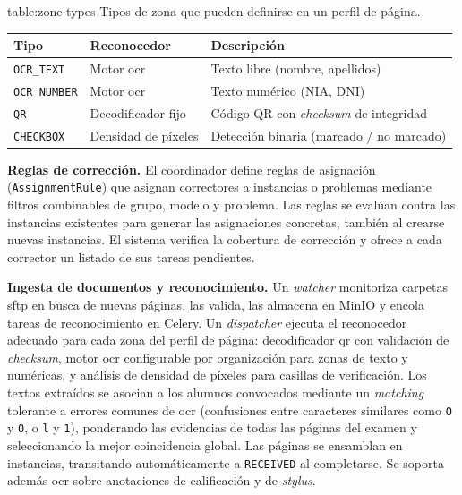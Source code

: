 \begin{functional}
  \begin{table}[Tipos de zona de reconocimiento]{table:zone-types}{%
      Tipos de zona que pueden definirse en un perfil de página.}
    \small
    \renewcommand{\arraystretch}{1.2}
    \begin{tabular}{l l p{7cm}}
      \hline
      \textbf{Tipo} & \textbf{Reconocedor} & \textbf{Descripción} \\
      \hline
      \texttt{OCR\_TEXT}    & Motor \acs{ocr} & Texto libre (nombre, apellidos) \\
      \texttt{OCR\_NUMBER}  & Motor \acs{ocr} & Texto numérico (NIA, DNI) \\
      \texttt{QR}           & Decodificador fijo & Código QR con
                               \textit{checksum} de integridad \\
      \texttt{CHECKBOX}     & Densidad de píxeles & Detección binaria
                               (marcado / no marcado) \\
      \hline
    \end{tabular}
  \end{table}
  \item \textbf{Reglas de corrección.}
  \label{rf:assignment}
  El coordinador define reglas de asignación (\texttt{AssignmentRule})
  que asignan correctores a instancias o problemas mediante filtros
  combinables de grupo, modelo y problema. Las reglas se evalúan contra
  las instancias existentes para generar las asignaciones concretas,
  también al crearse nuevas instancias. El sistema verifica la
  cobertura de corrección y ofrece a cada corrector un listado de sus
  tareas pendientes.

  \item \textbf{Ingesta de documentos y reconocimiento.}
  \label{rf:ingest}
  Un \textit{watcher} monitoriza carpetas \acs{sftp} en busca de nuevas
  páginas, las valida, las almacena en MinIO y encola tareas de
  reconocimiento en Celery. Un \textit{dispatcher} ejecuta el
  reconocedor adecuado para cada zona del perfil de página:
  decodificador \acs{qr} con validación de \textit{checksum}, motor
  \acs{ocr} configurable por organización para zonas de texto y
  numéricas, y análisis de densidad de píxeles para casillas de
  verificación. Los textos extraídos se asocian a los alumnos
  convocados mediante un \textit{matching} tolerante a errores comunes
  de \acs{ocr} (confusiones entre caracteres similares como \texttt{O}
  y \texttt{0}, o \texttt{l} y \texttt{1}), ponderando las evidencias
  de todas las páginas del examen y seleccionando la mejor coincidencia
  global. Las páginas se ensamblan en instancias, transitando
  automáticamente a \texttt{RECEIVED} al completarse. Se soporta además
  \acs{ocr} sobre anotaciones de calificación y de \textit{stylus}.


\end{functional}
